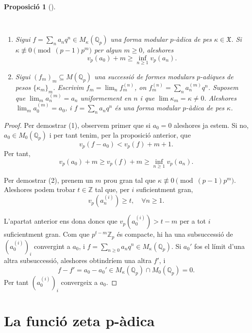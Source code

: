 \documentclass[
  letterpaper,
  DIV=11,
  numbers=noendperiod]{scrreprt}
\providecommand{\tightlist}{%
  \setlength{\itemsep}{0pt}\setlength{\parskip}{0pt}}\usepackage{longtable,booktabs,array}
\theoremstyle{plain}
\theoremstyle{plain}
\theoremstyle{definition}
\theoremstyle{plain}
\newtheorem{proposition}{Proposició}[chapter]
\theoremstyle{plain}
\theoremstyle{definition}
\theoremstyle{remark}
\begin{document}
\begin{proposition}[]\protect\hypertarget{prp-}{}\label{prp-}

~

\begin{enumerate}
\def\labelenumi{\arabic{enumi}.}
\tightlist
\item
  Sigui \(f=\sum_n a_n q^n\in M_{\kappa}(\mathbb{Q}_p)\) una forma
  modular \(p\)-àdica de pes \(\kappa\in\mathfrak{X}\). Si
  \(\kappa\not\equiv 0 \pmod{(p-1)p^m}\) per algun \(m\geq 0\),
  aleshores \[
  v_p(a_0)+m\geq \inf_{n\geq 1} v_p(a_n).
  \]
\item
  Sigui \((f_m)_m\subseteq M(\mathbb{Q}_p)\) una successió de formes
  modulars \(p\)-adiques de pesos \(\{\kappa_m\}_m\). Escrivim
  \(f_m = \lim_n f_m^{(n)}\), on \(f_m^{(n)} = \sum_{n} a_n^{(m)} q^n\).
  Suposem que \(\lim_m a_n^{(m)} = a_n\) uniformement en \(n\) i que
  \(\lim\kappa_m=\kappa\neq 0\). Aleshores \(\lim_m a_0^{(m)}= a_0\), i
  \(f=\sum_{n}a_nq^n\) és una forma modular \(p\)-àdica de pes
  \(\kappa\).
\end{enumerate}

\end{proposition}

\begin{proof}
Per demostrar (1), observem primer que si \(a_0=0\) aleshores ja estem.
Si no, \(a_0\in M_0(\mathbb{Q}_p)\) i per tant tenim, per la proposició
anterior, que \[
v_p(f-a_0)<v_p(f)+m+1.
\] Per tant, \[
v_p(a_0)+m\geq v_p(f)+m \geq \inf_{n\geq 1} v_p(a_n).
\]

Per demostrar (2), prenem un \(m\) prou gran tal que
\(\kappa\not\equiv 0 \pmod{(p-1)p^{m}}\). Aleshores podem trobar
\(t \in \mathbb{Z}\) tal que, per \(i\) suficientment gran, \[
v_p(a_{n}^{(i)})\geq t,\quad \forall n\geq 1.
\]

L'apartat anterior ens dona doncs que \(v_p(a_{0}^{(i)})>t-m\) per a tot
\(i\) suficientment gran. Com que \(p^{t-m}\mathbb{Z}_{p}\) és compacte,
hi ha una subsuccessió de \((a_0^{(i)})_i\) convergint a \(a_0\), i
\(f=\sum_{n\geq 0} a_n q^{n}\in M_{\kappa}(\mathbb{Q}_p)\). Si \(a_0'\)
fos el límit d'una altra subsuccessió, aleshores obtindríem una altra
\(f'\), i \[
f-f' = a_0-a_0'\in M_{\kappa}(\mathbb{Q}_p)\cap M_{0}(\mathbb{Q}_p)=0.
\] Per tant \((a_0^{(i)})_i\) convergeix a \(a_0\).
\end{proof}

\section{La funció zeta p-àdica}\label{la-funciuxf3-zeta-p-uxe0dica}
\end{document}
